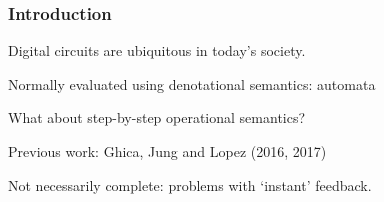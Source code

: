 \begin{frame}
    \frametitle{Introduction}

    Digital circuits are ubiquitous in today's society.

    \pause

    Normally evaluated using \alert{denotational semantics}: automata

    \pause

    What about step-by-step \alert{operational semantics}?

    \pause

    \alert{Previous work:} Ghica, Jung and Lopez (2016, 2017)

    \pause

    Not necessarily \alert{complete}: problems with `instant' feedback.

\end{frame}